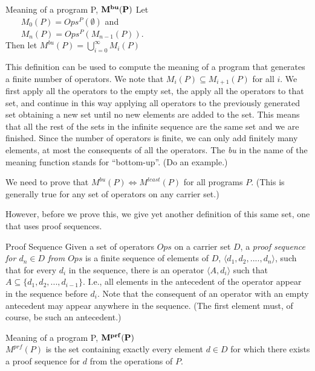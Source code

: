 \begin{definition}{Meaning of a program P, $\bf{M^{bu}(P)}$}
  Let\\
~~~  $M_0(P) = Ops^P(\emptyset)$ and \\
~~~  $M_n(P) = Ops^P(M_{n-1}(P))$.\\
  Then let $M^{bu}(P) = \bigcup_{i=0}^\infty M_i(P)$
\end{definition}

This definition can be used to compute the meaning of a program that
generates a finite number of operators.  We note that $M_i(P)
\subseteq M_{i+1}(P)$ for all $i$.  We first apply all the operators
to the empty set, the apply all the operators to that set, and
continue in this way applying all operators to the previously
generated set obtaining a new set until no new elements are added to
the set.  This means that all the rest of the sets in the infinite
sequence are the same set and we are finished.  Since the number of
operators is finite, we can only add finitely many elements, at most
the consequents of all the operators.  The {\em bu} in the name of the
meaning function stands for ``bottom-up''.  (Do an example.)

We need to prove that $M^{bu}(P) \iff M^{least}(P)$ for all programs
$P$.  (This is generally true for any set of operators on any carrier
set.)

However, before we prove this, we give yet another definition of this
same set, one that uses proof sequences.

\begin{definition}{Proof Sequence}
  Given a set of operators $Ops$ on a carrier set $D$, a {\em proof
    sequence for $d_n \in D$ from $Ops$} is a finite sequence of
  elements of $D$, $\langle d_1, d_2, ...., d_n \rangle$, such that
  for every $d_i$ in the sequence, there is an operator $\langle A,
  d_i \rangle$ such that $A \subseteq \{d_1, d_2, ..., d_{i-1}\}$.
  I.e., all elements in the antecedent of the operator appear in the
  sequence before $d_i$.  Note that the consequent of an operator with
  an empty antecedent may appear anywhere in the sequence.  (The first
  element must, of course, be such an antecedent.)
\end{definition}

\begin{definition}{Meaning of a program P, $\bf{M^{prf}(P)}$}\\
$M^{prf}(P)$ is the set containing exactly every element $d \in D$ for
  which there exists a proof sequence for $d$ from the operations of
  $P$.
\end{definition}

